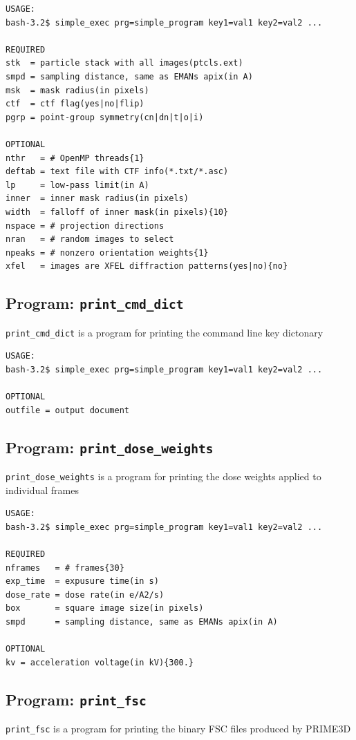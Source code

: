 \documentclass[a4paper,11pt]{article}
\newcommand{\prgname}[1]{\textcolor{NavyBlue}{\texttt{#1}}}
\begin{document}
\begin{verbatim}
USAGE:
bash-3.2$ simple_exec prg=simple_program key1=val1 key2=val2 ...

REQUIRED
stk  = particle stack with all images(ptcls.ext)
smpd = sampling distance, same as EMANs apix(in A)
msk  = mask radius(in pixels)
ctf  = ctf flag(yes|no|flip)
pgrp = point-group symmetry(cn|dn|t|o|i)

OPTIONAL
nthr   = # OpenMP threads{1}
deftab = text file with CTF info(*.txt/*.asc)
lp     = low-pass limit(in A)
inner  = inner mask radius(in pixels)
width  = falloff of inner mask(in pixels){10}
nspace = # projection directions
nran   = # random images to select
npeaks = # nonzero orientation weights{1}
xfel   = images are XFEL diffraction patterns(yes|no){no}
\end{verbatim}

\subsection{Program: \prgname{print\_cmd\_dict}}
\label{print_cmd_dict}
\prgname{print\_cmd\_dict} is a program for printing the command line key dictonary

\begin{verbatim}
USAGE:
bash-3.2$ simple_exec prg=simple_program key1=val1 key2=val2 ...

OPTIONAL
outfile = output document
\end{verbatim}

\subsection{Program: \prgname{print\_dose\_weights}}
\label{print_dose_weights}
\prgname{print\_dose\_weights} is a program for printing the dose weights applied to individual frames

\begin{verbatim}
USAGE:
bash-3.2$ simple_exec prg=simple_program key1=val1 key2=val2 ...

REQUIRED
nframes   = # frames{30}
exp_time  = expusure time(in s)
dose_rate = dose rate(in e/A2/s)
box       = square image size(in pixels)
smpd      = sampling distance, same as EMANs apix(in A)

OPTIONAL
kv = acceleration voltage(in kV){300.}
\end{verbatim}

\subsection{Program: \prgname{print\_fsc}}
\label{print_fsc}
\prgname{print\_fsc} is a program for printing the binary FSC files produced by PRIME3D
\end{document}
